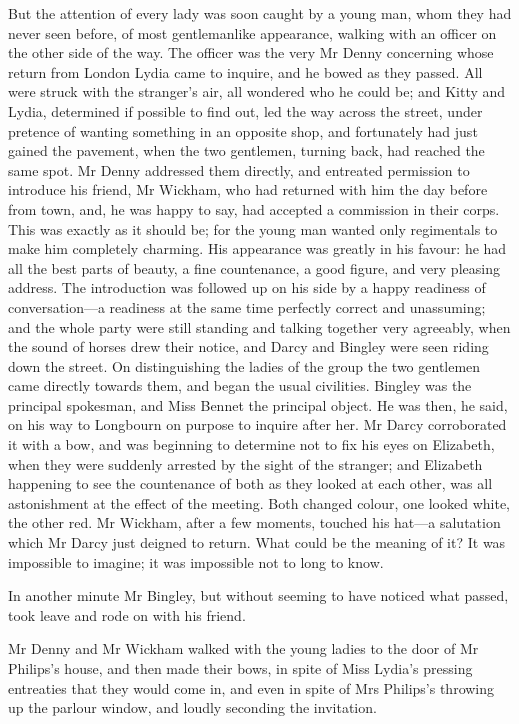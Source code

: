But the attention of every lady was soon caught by a young man, whom they had never seen before, of most gentlemanlike appearance, walking with an officer on the other side of the way. The officer was the very Mr Denny concerning whose return from London Lydia came to inquire, and he bowed as they passed. All were struck with the stranger's air, all wondered who he could be; and Kitty and Lydia, determined if possible to find out, led the way across the street, under pretence of wanting something in an opposite shop, and fortunately had just gained the pavement, when the two gentlemen, turning back, had reached the same spot. Mr Denny addressed them directly, and entreated permission to introduce his friend, Mr Wickham, who had returned with him the day before from town, and, he was happy to say, had accepted a commission in their corps. This was exactly as it should be; for the young man wanted only regimentals to make him completely charming. His appearance was greatly in his favour: he had all the best parts of beauty, a fine countenance, a good figure, and very pleasing address. The introduction was followed up on his side by a happy readiness of conversation—a readiness at the same time perfectly correct and unassuming; and the whole party were still standing and talking together very agreeably, when the sound of horses drew their notice, and Darcy and Bingley were seen riding down the street. On distinguishing the ladies of the group the two gentlemen came directly towards them, and began the usual civilities. Bingley was the principal spokesman, and Miss Bennet the principal object. He was then, he said, on his way to Longbourn on purpose to inquire after her. Mr Darcy corroborated it with a bow, and was beginning to determine not to fix his eyes on Elizabeth, when they were suddenly arrested by the sight of the stranger; and Elizabeth happening to see the countenance of both as they looked at each other, was all astonishment at the effect of the meeting. Both changed colour, one looked white, the other red. Mr Wickham, after a few moments, touched his hat—a salutation which Mr Darcy just deigned to return. What could be the meaning of it? It was impossible to imagine; it was impossible not to long to know.

In another minute Mr Bingley, but without seeming to have noticed what passed, took leave and rode on with his friend.

Mr Denny and Mr Wickham walked with the young ladies to the door of Mr Philips's house, and then made their bows, in spite of Miss Lydia's pressing entreaties that they would come in, and even in spite of Mrs Philips's throwing up the parlour window, and loudly seconding the invitation.


